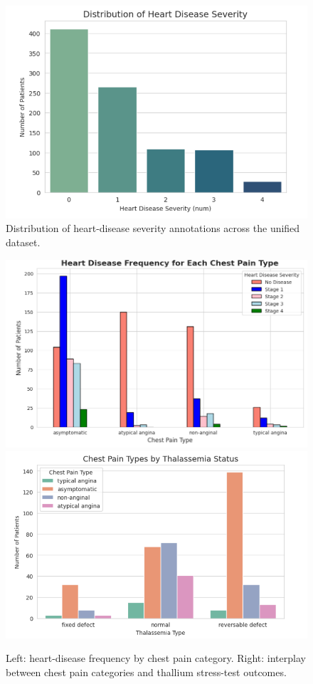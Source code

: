 \documentclass[conference]{IEEEtran}
\begin{document}
\begin{figure}[t]
  \centering
  \includegraphics[width=0.85\linewidth]{heart_disease_severity_distribution.png}
  \caption{Distribution of heart-disease severity annotations across the unified dataset.}
  \label{fig:severity_distribution}
\end{figure}

\begin{figure}[t]
  \centering
  \includegraphics[width=0.45\linewidth]{heart_disease_frequency_by_chest_pain_type.png}
  \hfill
  \includegraphics[width=0.45\linewidth]{chest_pain_categories_by_thallium_status.png}
  \caption{Left: heart-disease frequency by chest pain category. Right: interplay between chest pain categories and thallium stress-test outcomes.}
  \label{fig:cp_thallium}
\end{figure}
\end{document}
